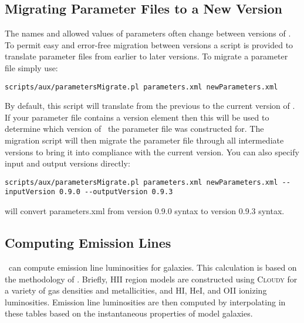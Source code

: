 \subsection{Migrating Parameter Files to a New Version}

The names and allowed values of parameters often change between versions of \glc. To permit easy and error-free migration between versions a script is provided to translate parameter files from earlier to later versions. To migrate a parameter file simply use:
\begin{verbatim}
scripts/aux/parametersMigrate.pl parameters.xml newParameters.xml
\end{verbatim}
By default, this script will translate from the previous to the current version of \glc. If your parameter file contains a {\normalfont \ttfamily version} element then this will be used to determine which version of \glc\ the parameter file was constructed for. The migration script will then migrate the parameter file through all intermediate versions to bring it into compliance with the current version. You can also specify input and output versions directly:
\begin{verbatim}
scripts/aux/parametersMigrate.pl parameters.xml newParameters.xml --inputVersion 0.9.0 --outputVersion 0.9.3
\end{verbatim}
will convert {\normalfont \ttfamily parameters.xml} from version 0.9.0 syntax to version 0.9.3 syntax.

\subsection{Computing Emission Lines}\label{sec:EmissionLineTutorial}

\glc\ can compute emission line luminosities for galaxies. This calculation is based on the methodology of \cite{panuzzo_dust_2003}. Briefly, HII region models are constructed using {\normalfont \scshape Cloudy} for a variety of gas densities and metallicities, and HI, HeI, and OII ionizing luminosities. Emission line luminosities are then computed by interpolating in these tables based on the instantaneous properties of model galaxies.

